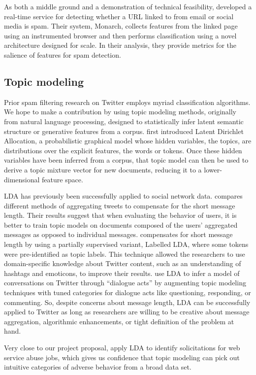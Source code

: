 \documentclass[journal]{IEEEtran}
\begin{document}
As both a middle ground and a demonstration of technical feasibility, \cite{Thomas2011} developed a real-time service for detecting whether a URL linked to from email or social media is spam. Their system, Monarch, collects features from the linked page using an instrumented browser and then performs classification using a novel architecture designed for scale. In their analysis, they provide metrics for the salience of features for spam detection.

\subsection{Topic modeling}
Prior spam filtering research on Twitter employs myriad classification algorithms. We hope to make a contribution by using topic modeling methods, originally from natural language processing, designed to statistically infer latent semantic structure or generative features from a corpus. \cite{Blei2003} first introduced Latent Dirichlet Allocation, a probabilistic graphical model whose hidden variables, the topics, are distributions over the explicit features, the words or tokens. Once these hidden variables have been inferred from a corpus, that topic model can then be used to derive a topic mixture vector for new documents, reducing it to a lower-dimensional feature space.

LDA has previously been successfully applied to social network data. \cite{Hong2010} compares different methods of aggregating tweets to compensate for the short message length. Their results suggest that when evaluating the behavior of users, it is better to train topic models on documents composed of the users' aggregated messages as opposed to individual messages. \cite{Ramage2010} compensates for short message length by using a partially supervised variant, Labelled LDA, where some tokens were pre-identified as topic labels. This technique allowed the researchers to use domain-specific knowledge about Twitter content, such as an understanding of hashtags and emoticons, to improve their results. \cite{Ritter2010} use LDA to infer a model of conversations on Twitter through ``dialogue acts'' by augmenting topic modeling techniques with tuned categories for dialogue acts like questioning, responding, or commenting. So, despite concerns about message length, LDA can be successfully applied to Twitter as long as researchers are willing to be creative about message aggregation, algorithmic enhancements, or tight definition of the problem at hand.

Very close to our project proposal, \cite{Kim2011} apply LDA to identify solicitations for web service abuse jobs, which gives us confidence that topic modeling can pick out intuitive categories of adverse behavior from a broad data set. 



\end{document}
